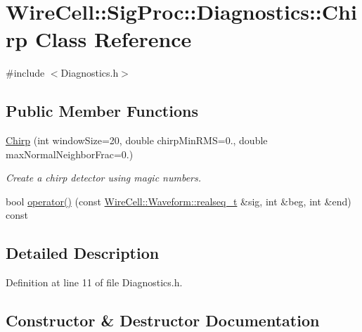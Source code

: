 \hypertarget{class_wire_cell_1_1_sig_proc_1_1_diagnostics_1_1_chirp}{}\section{Wire\+Cell\+:\+:Sig\+Proc\+:\+:Diagnostics\+:\+:Chirp Class Reference}
\label{class_wire_cell_1_1_sig_proc_1_1_diagnostics_1_1_chirp}


{\ttfamily \#include $<$Diagnostics.\+h$>$}

\subsection*{Public Member Functions}
\begin{DoxyCompactItemize}
\item 
\hyperlink{class_wire_cell_1_1_sig_proc_1_1_diagnostics_1_1_chirp_a948f8ce927f442364d46d9f81f0b127a}{Chirp} (int window\+Size=20, double chirp\+Min\+R\+MS=0., double max\+Normal\+Neighbor\+Frac=0.)
\begin{DoxyCompactList}\small\item\em Create a chirp detector using magic numbers. \end{DoxyCompactList}\item 
bool \hyperlink{class_wire_cell_1_1_sig_proc_1_1_diagnostics_1_1_chirp_a3a5cce17cbe9e7c420c44323efc57468}{operator()} (const \hyperlink{namespace_wire_cell_1_1_waveform_a479175e541c8545e87cd8063b74b6956}{Wire\+Cell\+::\+Waveform\+::realseq\+\_\+t} \&sig, int \&beg, int \&end) const
\end{DoxyCompactItemize}


\subsection{Detailed Description}


Definition at line 11 of file Diagnostics.\+h.



\subsection{Constructor \& Destructor Documentation}
\mbox{\label{class_wire_cell_1_1_sig_proc_1_1_diagnostics_1_1_chirp_a948f8ce927f442364d46d9f81f0b127a}} 
